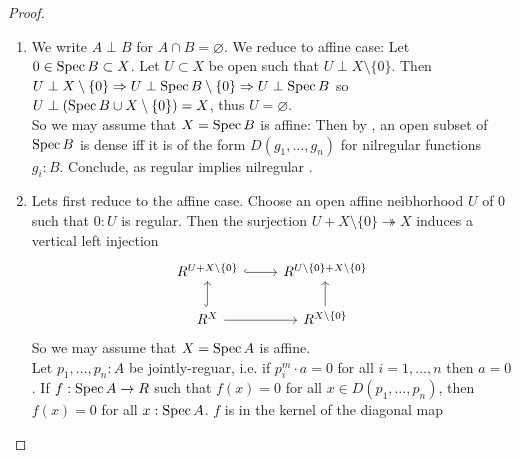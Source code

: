 \documentclass{article}
\begin{document}
\begin{proof}
	\begin{enumerate}
		\item We write $A \perp B$ for $A \cap B = \varnothing$. We reduce to affine case: Let $0 \in \operatorname{Spec} B \subset X$. Let $U \subset X$ be open such that $U \perp X \setminus \{0\}$. Then $U \perp X \setminus \{0\} \Rightarrow U \perp \operatorname{Spec} B \setminus \{0\} \Rightarrow U \perp \operatorname{Spec} B$ so $U \perp (\operatorname{Spec} B \cup X \setminus \{0\}) = X$, thus $U = \varnothing$. \\
		So we may assume that $X = \operatorname{Spec} B$ is affine: Then by \cite{SAGtopology}, an open subset of $\operatorname{Spec} B$ is dense iff it is of the form $D(g_1,\hdots,g_n)$ for nilregular functions $g_i : B$. Conclude, as regular implies nilregular \cite{SAGtopology}.
		\item Lets first reduce to the affine case. Choose an open affine neibhorhood $U$ of $0$ such that $0 : U$ is regular. Then the surjection $U + X \setminus \{0\} \twoheadrightarrow X$ induces a vertical left injection 
	\[\begin{tikzcd}
		{R^{U + X \setminus \{0\}}} & {R^{U \setminus \{0\} + X \setminus \{0\}}} \\
		{R^X} & {R^{X \setminus \{0\}}}
		\arrow[hook, from=1-1, to=1-2]
		\arrow[hook, from=2-1, to=1-1]
		\arrow[from=2-1, to=2-2]
		\arrow[from=2-2, to=1-2]
	\end{tikzcd}\]
	So we may assume that $X = \operatorname{Spec} A$ is affine. \\
	Let $p_1,\hdots,p_n : A$ be jointly-reguar, i.e. if $p_i^m \cdot a = 0$ for all $i=1,\hdots,n$ then $a = 0$. If $f : \operatorname{Spec} A \to R$ such that $f(x) = 0$ for all $x \in D(p_1,\hdots,p_n)$, then $f(x) = 0$ for all $x : \operatorname{Spec} A$.
	$f$ is in the kernel of the diagonal map

\end{enumerate}
\end{proof}
\end{document}
